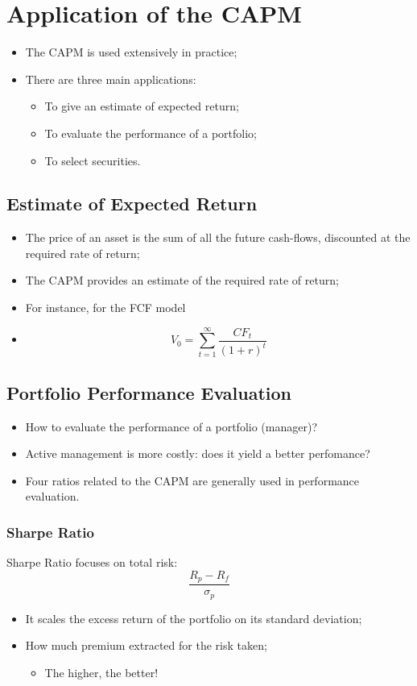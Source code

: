 \documentclass[11pt,a4paper]{report}
\begin{document}
\section{Application of the CAPM}
\begin{itemize}
    \item The CAPM is used extensively in practice;
    \item There are three main applications:
    \begin{itemize}
        \item To give an estimate of expected return;
        \item To evaluate the performance of a portfolio;
        \item To select securities. 
    \end{itemize}
\end{itemize}
\subsection{Estimate of Expected Return}
\begin{itemize}
    \item The price of an asset is the sum of all the future cash-flows, discounted at the required rate of return;
    \item The CAPM provides an estimate of the required rate of return;
    \item For instance, for the FCF model
    \item \[V_0 = \sum_{t=1}^{\infty}\frac{CF_t}{(1+r)^t}\]
\end{itemize}
\subsection{Portfolio Performance Evaluation}
\begin{itemize}
    \item How to evaluate the performance of a portfolio (manager)?
    \item Active management is more costly: does it yield a better perfomance?
    \item Four ratios related to the CAPM are generally used in performance evaluation.
\end{itemize}
\subsubsection{Sharpe Ratio}
Sharpe Ratio focuses on total risk:
\[\frac{R_p - R_f}{\sigma_p}\]
\begin{itemize}
    \item It scales the excess return of the portfolio on its standard deviation;
    \item How much premium extracted for the risk taken;
    \begin{itemize}
        \item The higher, the better!
    \end{itemize}
\end{itemize}
\end{document}

